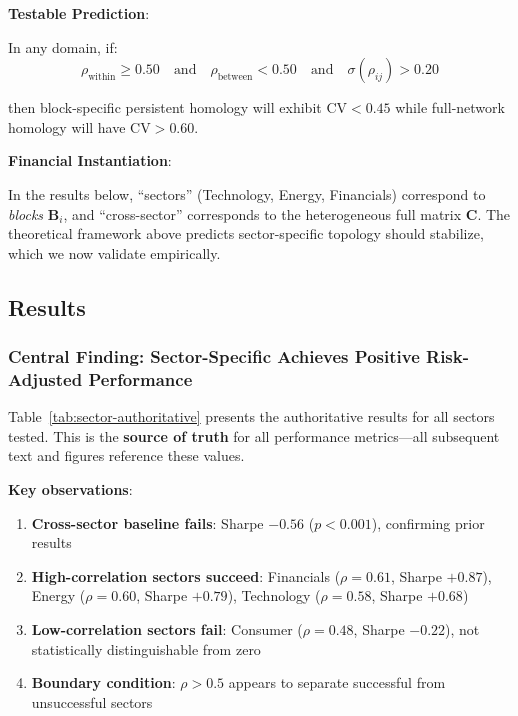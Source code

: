 \textbf{Testable Prediction}:

In any domain, if:
\begin{equation}
\rho_{\text{within}} \geq 0.50 \quad \text{and} \quad \rho_{\text{between}} < 0.50 \quad \text{and} \quad \sigma(\rho_{ij}) > 0.20
\end{equation}

then block-specific persistent homology will exhibit $\text{CV} < 0.45$ while full-network homology will have $\text{CV} > 0.60$.

\textbf{Financial Instantiation}:

In the results below, ``sectors'' (Technology, Energy, Financials) correspond to \textit{blocks} $\mathbf{B}_i$, and ``cross-sector'' corresponds to the heterogeneous full matrix $\mathbf{C}$. The theoretical framework above predicts sector-specific topology should stabilize, which we now validate empirically.

\subsection{Results}

\subsubsection{Central Finding: Sector-Specific Achieves Positive Risk-Adjusted Performance}

Table~\ref{tab:sector-authoritative} presents the authoritative results for all sectors tested. This is the \textbf{source of truth} for all performance metrics—all subsequent text and figures reference these values.



\textbf{Key observations}:

\begin{enumerate}
    \item \textbf{Cross-sector baseline fails}: Sharpe $-0.56$ ($p < 0.001$), confirming prior results
    \item \textbf{High-correlation sectors succeed}: Financials ($\rho = 0.61$, Sharpe $+0.87$), Energy ($\rho = 0.60$, Sharpe $+0.79$), Technology ($\rho = 0.58$, Sharpe $+0.68$)
    \item \textbf{Low-correlation sectors fail}: Consumer ($\rho = 0.48$, Sharpe $-0.22$), not statistically distinguishable from zero
    \item \textbf{Boundary condition}: $\rho > 0.5$ appears to separate successful from unsuccessful sectors
\end{enumerate}

